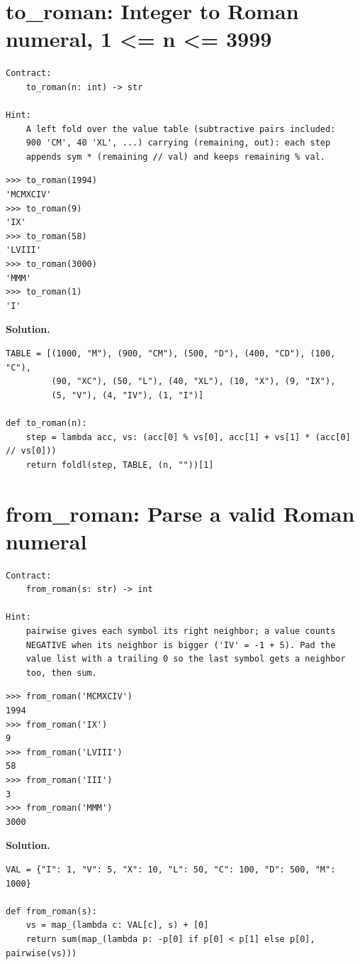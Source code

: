 \documentclass[10pt,letterpaper]{book}
\begin{document}
\section{to\_roman: Integer to Roman numeral, 1 <= n <= 3999}
\begin{lstlisting}[style=ex]
Contract:
    to_roman(n: int) -> str

Hint:
    A left fold over the value table (subtractive pairs included:
    900 'CM', 40 'XL', ...) carrying (remaining, out): each step
    appends sym * (remaining // val) and keeps remaining % val.
\end{lstlisting}
\begin{lstlisting}[style=ex]
>>> to_roman(1994)
'MCMXCIV'
>>> to_roman(9)
'IX'
>>> to_roman(58)
'LVIII'
>>> to_roman(3000)
'MMM'
>>> to_roman(1)
'I'
\end{lstlisting}
\noindent\textbf{Solution.}
\begin{lstlisting}[style=code]
TABLE = [(1000, "M"), (900, "CM"), (500, "D"), (400, "CD"), (100, "C"),
         (90, "XC"), (50, "L"), (40, "XL"), (10, "X"), (9, "IX"),
         (5, "V"), (4, "IV"), (1, "I")]

def to_roman(n):
    step = lambda acc, vs: (acc[0] % vs[0], acc[1] + vs[1] * (acc[0] // vs[0]))
    return foldl(step, TABLE, (n, ""))[1]
\end{lstlisting}

\section{from\_roman: Parse a valid Roman numeral}
\begin{lstlisting}[style=ex]
Contract:
    from_roman(s: str) -> int

Hint:
    pairwise gives each symbol its right neighbor; a value counts
    NEGATIVE when its neighbor is bigger ('IV' = -1 + 5). Pad the
    value list with a trailing 0 so the last symbol gets a neighbor
    too, then sum.
\end{lstlisting}
\begin{lstlisting}[style=ex]
>>> from_roman('MCMXCIV')
1994
>>> from_roman('IX')
9
>>> from_roman('LVIII')
58
>>> from_roman('III')
3
>>> from_roman('MMM')
3000
\end{lstlisting}
\noindent\textbf{Solution.}
\begin{lstlisting}[style=code]
VAL = {"I": 1, "V": 5, "X": 10, "L": 50, "C": 100, "D": 500, "M": 1000}

def from_roman(s):
    vs = map_(lambda c: VAL[c], s) + [0]
    return sum(map_(lambda p: -p[0] if p[0] < p[1] else p[0], pairwise(vs)))
\end{lstlisting}
\end{document}
